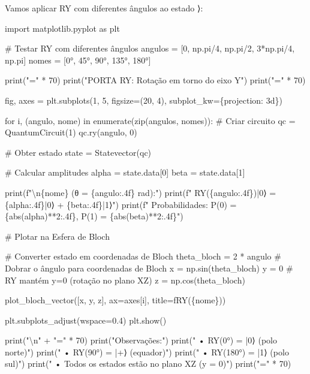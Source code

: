 \documentclass[
  brazilian,
]{report}
\newenvironment{Shaded}{\begin{snugshade}}{\end{snugshade}}
\newcommand{\NormalTok}[1]{\textcolor[rgb]{0.00,0.23,0.31}{#1}}
\begin{document}
Vamos aplicar RY com diferentes ângulos ao estado ⟩:

\begin{Shaded}
\begin{Highlighting}[]
\NormalTok{import matplotlib.pyplot as plt}

\NormalTok{\# Testar RY com diferentes ângulos}
\NormalTok{angulos = [0, np.pi/4, np.pi/2, 3*np.pi/4, np.pi]}
\NormalTok{nomes = [\textquotesingle{}0°\textquotesingle{}, \textquotesingle{}45°\textquotesingle{}, \textquotesingle{}90°\textquotesingle{}, \textquotesingle{}135°\textquotesingle{}, \textquotesingle{}180°\textquotesingle{}]}

\NormalTok{print("=" * 70)}
\NormalTok{print("PORTA RY: Rotação em torno do eixo Y")}
\NormalTok{print("=" * 70)}

\NormalTok{fig, axes = plt.subplots(1, 5, figsize=(20, 4), subplot\_kw=\{\textquotesingle{}projection\textquotesingle{}: \textquotesingle{}3d\textquotesingle{}\})}

\NormalTok{for i, (angulo, nome) in enumerate(zip(angulos, nomes)):}
\NormalTok{    \# Criar circuito}
\NormalTok{    qc = QuantumCircuit(1)}
\NormalTok{    qc.ry(angulo, 0)}
    
\NormalTok{    \# Obter estado}
\NormalTok{    state = Statevector(qc)}
    
\NormalTok{    \# Calcular amplitudes}
\NormalTok{    alpha = state.data[0]}
\NormalTok{    beta = state.data[1]}
    
\NormalTok{    print(f"\textbackslash{}n\{nome\} (θ = \{angulo:.4f\} rad):")}
\NormalTok{    print(f"  RY(\{angulo:.4f\})|0⟩ = \{alpha:.4f\}|0⟩ + \{beta:.4f\}|1⟩")}
\NormalTok{    print(f"  Probabilidades: P(0) = \{abs(alpha)**2:.4f\}, P(1) = \{abs(beta)**2:.4f\}")}
    
\NormalTok{    \# Plotar na Esfera de Bloch}
    
\NormalTok{    \# Converter estado em coordenadas de Bloch}
\NormalTok{    theta\_bloch = 2 * angulo  \# Dobrar o ângulo para coordenadas de Bloch}
\NormalTok{    x = np.sin(theta\_bloch)}
\NormalTok{    y = 0  \# RY mantém y=0 (rotação no plano XZ)}
\NormalTok{    z = np.cos(theta\_bloch)}
    
\NormalTok{    plot\_bloch\_vector([x, y, z], ax=axes[i], title=f\textquotesingle{}RY(\{nome\})\textquotesingle{})}

\NormalTok{plt.subplots\_adjust(wspace=0.4)}
\NormalTok{plt.show()}

\NormalTok{print("\textbackslash{}n" + "=" * 70)}
\NormalTok{print("Observações:")}
\NormalTok{print("  • RY(0°) = |0⟩ (polo norte)")}
\NormalTok{print("  • RY(90°) = |+⟩ (equador)")  }
\NormalTok{print("  • RY(180°) = |1⟩ (polo sul)")}
\NormalTok{print("  • Todos os estados estão no plano XZ (y = 0)")}
\NormalTok{print("=" * 70)}
\end{Highlighting}
\end{Shaded}
\end{document}
